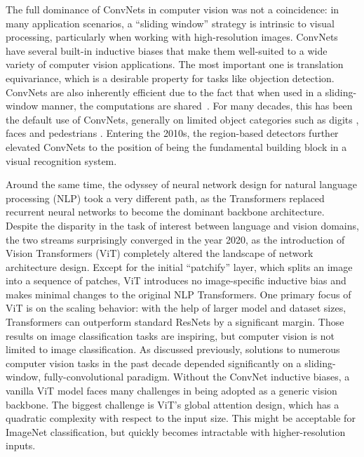 \documentclass[10pt,twocolumn,letterpaper]{article}
\begin{document}
The full dominance of ConvNets in computer vision was not a coincidence: in many application scenarios, a ``sliding window'' strategy is intrinsic to visual processing, particularly when working with high-resolution images. ConvNets have several built-in inductive biases that make them well-suited to a wide variety of computer vision applications. The most important one is translation equivariance, which is a desirable property for tasks like objection detection. ConvNets are also inherently efficient due to the fact that when used in a sliding-window manner, the computations are shared~\cite{Sermanet2014}. For many decades, this has been the default use of ConvNets, generally on limited object categories such as digits \cite{lecun1998gradient}, faces \cite{vaillant1994original,rowley1998neural} and pedestrians \cite{sermanet2013pedestrian, dollar2010fastest}. Entering the 2010s, the region-based detectors \cite{Girshick2014, Girshick2015, Ren2015, He2017} further elevated ConvNets to the position of being the fundamental building block in a visual recognition system. 

Around the same time, the odyssey of neural network design for natural language processing (NLP) took a very different path, as the Transformers replaced recurrent neural networks to become the dominant backbone architecture. Despite the disparity in the task of interest between language and vision domains, the two streams surprisingly converged in the year 2020, as the introduction of Vision Transformers (ViT) completely altered the landscape of network architecture design. Except for the initial ``patchify'' layer, which splits an image into a sequence of patches, ViT introduces no image-specific inductive bias and makes minimal changes to the original NLP Transformers. One primary focus of ViT is on the scaling behavior: with the help of larger model and dataset sizes, Transformers can outperform standard ResNets by a significant margin. Those results on image classification tasks are inspiring, but computer vision is not limited to image classification. As discussed previously, solutions to numerous computer vision tasks in the past decade depended significantly on a sliding-window, fully-convolutional paradigm. Without the ConvNet inductive biases, a vanilla ViT model faces many challenges in being adopted as a generic vision backbone. The biggest challenge is ViT's global attention design, which has a quadratic complexity with respect to the input size. This might be acceptable for ImageNet classification, but quickly becomes intractable with higher-resolution inputs. 
\end{document}
